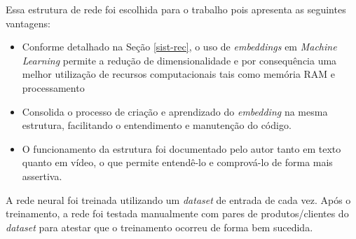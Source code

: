 Essa estrutura de rede foi escolhida para o trabalho pois apresenta as seguintes vantagens:

\begin{itemize}
    \item Conforme detalhado na Seção \ref{sist-rec}, o uso de \textit{embeddings} em \textit{Machine Learning} permite a redução de dimensionalidade e por consequência uma melhor utilização de recursos computacionais tais como memória RAM e processamento
    \item Consolida o processo de criação e aprendizado do \textit{embedding} na mesma estrutura, facilitando o entendimento e manutenção do código.
    \item O funcionamento da estrutura foi documentado pelo autor tanto em texto quanto em vídeo, o que permite entendê-lo e comprová-lo de forma mais assertiva.
\end{itemize}

A rede neural foi treinada utilizando um \textit{dataset} de entrada de cada vez. Após o treinamento, a rede foi testada manualmente com pares de produtos/clientes do \textit{dataset} para atestar que o treinamento ocorreu de forma bem sucedida.